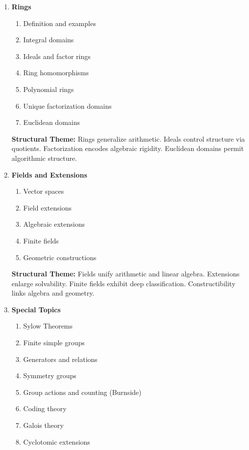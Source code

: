 \begin{enumerate}
\item \textbf{Rings}

\begin{enumerate}
    \item Definition and examples
    \item Integral domains
    \item Ideals and factor rings
    \item Ring homomorphisms
    \item Polynomial rings
    \item Unique factorization domains
    \item Euclidean domains
\end{enumerate}

\vspace{0.5em}
\textbf{Structural Theme:}
Rings generalize arithmetic.
Ideals control structure via quotients.
Factorization encodes algebraic rigidity.
Euclidean domains permit algorithmic structure.


\item \textbf{Fields and Extensions}

\begin{enumerate}
    \item Vector spaces
    \item Field extensions
    \item Algebraic extensions
    \item Finite fields
    \item Geometric constructions
\end{enumerate}

\vspace{0.5em}
\textbf{Structural Theme:}
Fields unify arithmetic and linear algebra.
Extensions enlarge solvability.
Finite fields exhibit deep classification.
Constructibility links algebra and geometry.


\item \textbf{Special Topics}

\begin{enumerate}
    \item Sylow Theorems
    \item Finite simple groups
    \item Generators and relations
    \item Symmetry groups
    \item Group actions and counting (Burnside)
    \item Coding theory
    \item Galois theory
    \item Cyclotomic extensions
\end{enumerate}


\end{enumerate}
